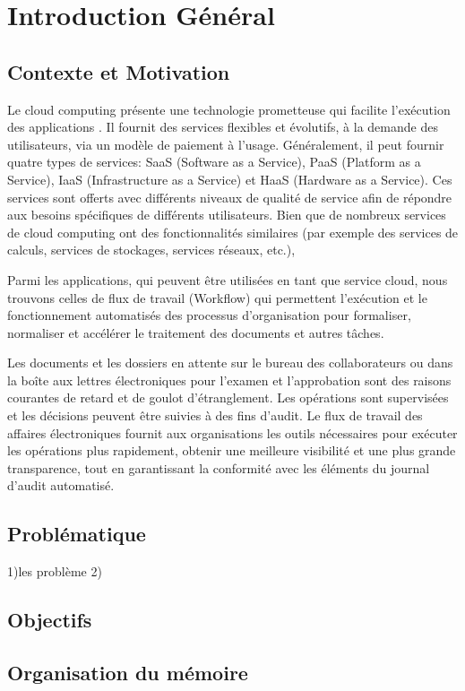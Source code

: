 \chapter*{Introduction Général }


\section*{Contexte et Motivation} 
Le cloud computing  présente une technologie prometteuse qui facilite l'exécution des applications . Il fournit des services flexibles et évolutifs, à la demande des utilisateurs, via un modèle de paiement à l'usage. Généralement, il peut fournir quatre types de services: SaaS (Software as a Service), PaaS (Platform as a Service), IaaS (Infrastructure as a Service) et HaaS (Hardware as a Service). Ces services sont offerts avec différents niveaux de qualité de service afin de répondre aux besoins spécifiques de différents utilisateurs. Bien que de nombreux services de cloud computing  ont des fonctionnalités similaires (par exemple des services de calculs, services de stockages, services  réseaux, etc.),

Parmi les  applications, qui peuvent être  utilisées en tant que service cloud, nous trouvons celles de flux de travail (Workflow)  qui permettent l'exécution et le fonctionnement automatisés des processus d'organisation pour formaliser, normaliser et accélérer le traitement des documents et autres tâches.

 Les documents et les dossiers en attente sur le bureau des collaborateurs ou dans la boîte aux lettres électroniques pour l'examen et l'approbation sont  des raisons courantes de retard et de goulot d'étranglement. Les opérations sont supervisées et les décisions peuvent être suivies à des fins d'audit. Le flux de travail des affaires électroniques fournit aux organisations les outils nécessaires pour exécuter les opérations plus rapidement, obtenir une meilleure visibilité et une plus grande transparence, tout en garantissant la conformité avec les éléments du journal d'audit automatisé.


\section*{Problématique}



1)les problème 
2)





 
\section*{Objectifs}


\section*{Organisation du mémoire}